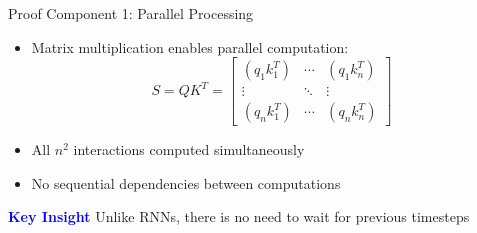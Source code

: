 \documentclass[serif, aspectratio=169]{beamer}
\begin{document}

\begin{frame}{Proof Component 1: Parallel Processing}
    \begin{itemize}
        \item Matrix multiplication enables parallel computation:
        \begin{equation*}
            S = QK^T = \begin{bmatrix}
            (q_1k_1^T) & \cdots & (q_1k_n^T) \\
            \vdots & \ddots & \vdots \\
            (q_nk_1^T) & \cdots & (q_nk_n^T)
            \end{bmatrix}
        \end{equation*}
        \item All $n^2$ interactions computed simultaneously
        \item No sequential dependencies between computations
    \end{itemize}
    \textcolor{blue}{\textbf{Key Insight}}
    \newline
        Unlike RNNs, there is no need to wait for previous timesteps
\end{frame}
\end{document}
